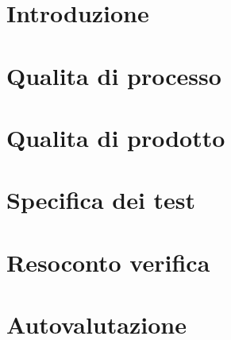 \documentclass[a4paper, oneside, openany, dvipsnames, table]{article}
\begin{document}
\copertina{}



\newpage
\tableofcontents

\newpage
\listoftables

\newpage
\listoffigures

\newpage
\section{Introduzione}\label{sec:Introduzione}


\newpage
\section{Qualita di processo}\label{sec:Qualita-di-processo}


\newpage
\section{Qualita di prodotto}\label{sec:Qualita-di-prodotto}


\newpage
\section{Specifica dei test}\label{sec:Specifica-dei-test}


\newpage
\section{Resoconto verifica}\label{sec:Resoconto-verifica}


\newpage
\section{Autovalutazione}\label{sec:Autovalutazione}

\end{document}
